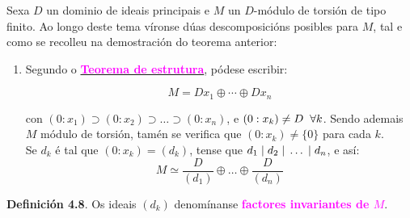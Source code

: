 \documentclass[twoside]{report}
\newcommand{\magbf}[1]{\textcolor{magenta}{\textbf{#1}}} %
\theoremstyle{mystyle}
\begin{document}
\vspace{5mm}

\noindent Sexa $D$ un dominio de ideais principais e $M$ un $D$-módulo de torsión de tipo finito. Ao longo deste tema víronse dúas descomposicións posibles para $M$, tal e como se recolleu na demostración do teorema anterior:\\

\renewcommand{\theenumi}{\roman{enumi})}
\renewcommand{\labelenumi}{\theenumi}

\begin{enumerate}

    \item Segundo o \hyperref[th4.2]{\magbf{Teorema de estrutura}}, pódese escribir:
    
    $$M = Dx_{1} \oplus \cdots \oplus Dx_{n}$$
    
    \vspace{2mm}
    
    con $(0 : x_{1}) \supset (0 : x_{2}) \supset \dots \supset (0 : x_{n})$, e $(0 : x_{k}) \neq D \hspace{2mm} \forall k$. Sendo ademais $M$ módulo de torsión, tamén se verifica que $(0 : x_{k}) \neq \{0\}$ para cada $k$.\\
    
    Se $d_{k}$ é tal que $(0 : x_{k}) = (d_{k})$, tense que $d_{1} \hspace{1mm} | \hspace{1mm} d_{2} \hspace{1mm} | \hspace{1mm} \dots \hspace{1mm} | \hspace{1mm} d_{n}$, e así:
    $$M \simeq \displaystyle \frac{D}{(d_{1})} \oplus \dots \oplus \frac{D}{(d_{n})}$$
\end{enumerate}

\noindent \textbf{Definición 4.8}. Os ideais $(d_{k})$ denomínanse \magbf{factores invariantes de $M$}.\\
\end{document}
